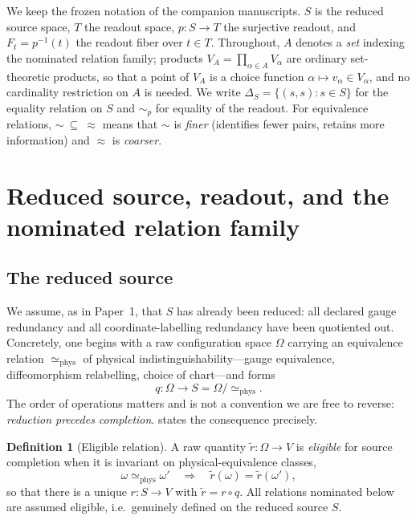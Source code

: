 \documentclass[11pt,reqno]{amsart}
\theoremstyle{plain}
\theoremstyle{definition}
\newtheorem{definition}[theorem]{Definition}
\theoremstyle{remark}
\numberwithin{equation}{section}
\begin{document}
We keep the frozen notation of the companion manuscripts. $S$ is the reduced source space, $T$ the
readout space, $p\colon S\to T$ the surjective readout, and $F_t=p^{-1}(t)$ the readout fiber over
$t\in T$. Throughout, $A$ denotes a \emph{set} indexing the nominated relation family; products
$V_A=\prod_{\alpha\in A}V_\alpha$ are ordinary set-theoretic products, so that a point of $V_A$ is a
choice function $\alpha\mapsto v_\alpha\in V_\alpha$, and no cardinality restriction on $A$ is
needed. We write $\Delta_S=\{(s,s):s\in S\}$ for the equality relation on $S$ and $\sim_p$ for
equality of the readout. For equivalence relations, $\sim\ \subseteq\ \approx$ means that $\sim$ is
\emph{finer} (identifies fewer pairs, retains more information) and $\approx$ is \emph{coarser}.

\section{Reduced source, readout, and the nominated relation family}
\label{sec:setup}

\subsection{The reduced source}

We assume, as in Paper~1, that $S$ has already been reduced: all declared gauge redundancy and all
coordinate-labelling redundancy have been quotiented out. Concretely, one begins with a raw
configuration space $\Omega$ carrying an equivalence relation $\simeq_{\mathrm{phys}}$ of physical
indistinguishability---gauge equivalence, diffeomorphism relabelling, choice of chart---and forms
\begin{equation}
\label{eq:gauge-quotient}
q\colon\Omega\longrightarrow S=\Omega/\!\simeq_{\mathrm{phys}}.
\end{equation}
The order of operations matters and is not a convention we are free to reverse: \emph{reduction
precedes completion}.  states the consequence precisely.

\begin{definition}[Eligible relation]
\label{def:eligible}
A raw quantity $\widetilde r\colon\Omega\to V$ is \emph{eligible} for source completion when it is
invariant on physical-equivalence classes,
\begin{equation}
\label{eq:eligible}
\omega\simeq_{\mathrm{phys}}\omega'
\quad\Longrightarrow\quad
\widetilde r(\omega)=\widetilde r(\omega'),
\end{equation}
so that there is a unique $r\colon S\to V$ with $\widetilde r=r\circ q$. All relations nominated
below are assumed eligible, i.e.\ genuinely defined on the reduced source $S$.
\end{definition}
\end{document}
